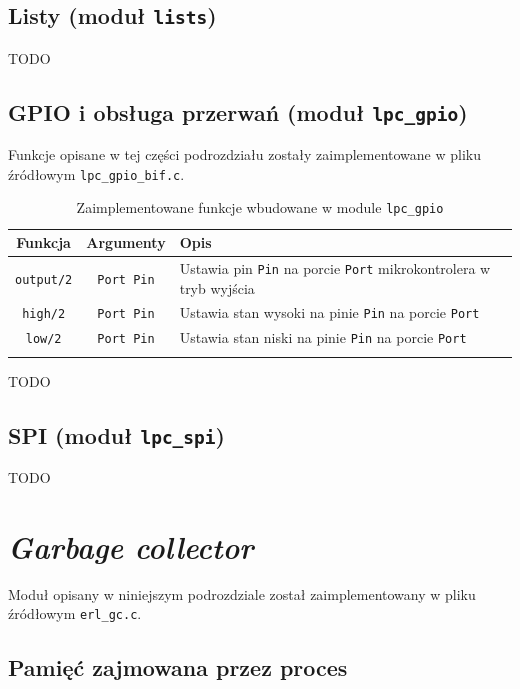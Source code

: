 \subsection{Listy (moduł \texttt{lists})}
\label{sub:bifLists}

TODO

\subsection{GPIO i obsługa przerwań (moduł \texttt{lpc\_gpio})}
\label{sub:bifGPIO}
Funkcje opisane w tej części podrozdziału zostały zaimplementowane w pliku źródłowym \texttt{lpc\_gpio\_bif.c}.

\begin{longtable}{|c|c|p{10cm}|}
\hline

Funkcja & Argumenty & Opis \\
\endfirsthead
\hline
\texttt{output/2} & \texttt{Port Pin} & Ustawia pin \texttt{Pin} na porcie \texttt{Port} mikrokontrolera w tryb wyjścia\\
\hline
\texttt{high/2} & \texttt{Port Pin} & Ustawia stan wysoki na pinie \texttt{Pin} na porcie \texttt{Port} \\
\hline
\texttt{low/2} & \texttt{Port Pin} & Ustawia stan niski na pinie \texttt{Pin} na porcie \texttt{Port} \\
\hline
\caption{Zaimplementowane funkcje wbudowane w module \texttt{lpc\_gpio}} 
\label{table:bifGpio} \\
\end{longtable}

TODO

\subsection{SPI (moduł \texttt{lpc\_spi})}
\label{sub:bifSPI}

TODO

\section{\emph{Garbage collector}}
\label{sec:maszynaGC}

Moduł opisany w niniejszym podrozdziale został zaimplementowany w pliku źródłowym \texttt{erl\_gc.c}.

\subsection{Pamięć zajmowana przez proces}
\label{sub:gcHeap}

